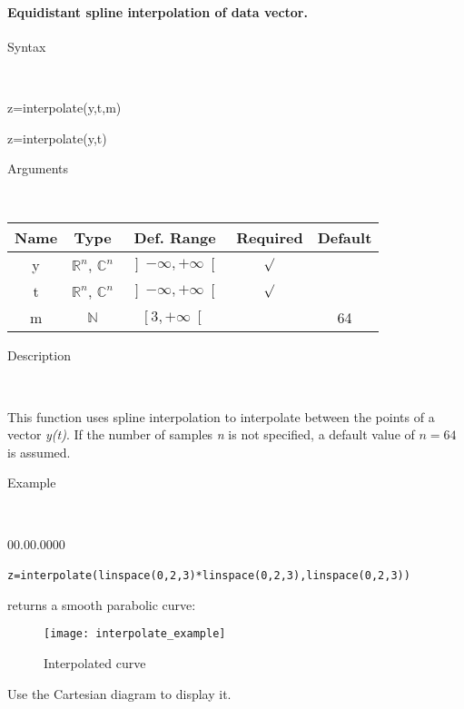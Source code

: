 \paragraph{\label{par:spline-interpolation}Equidistant spline interpolation
of data vector.}

\begin{description}
\item [Syntax]~
\end{description}
z=interpolate(y,t,m)

z=interpolate(y,t)

\begin{description}
\item [Arguments]~
\end{description}
\begin{tabular}{|c|c|c|c|c|}
\hline 
Name&
Type&
Def. Range&
Required&
Default\tabularnewline
\hline
\hline 
y&
$\mathbb{R}^{n}$, $\mathbb{C}^{n}$&
$\left]-\infty,+\infty\right[$&
$\surd$&
\tabularnewline
\hline
t&
$\mathbb{R}^{n}$, $\mathbb{C}^{n}$&
$\left]-\infty,+\infty\right[$&
$\surd$&
\tabularnewline
\hline
m&
$\mathbb{N}$&
$\left[3,+\infty\right[$&
&
64\tabularnewline
\hline
\end{tabular}

\begin{description}
\item [Description]~
\end{description}
This function uses spline interpolation to interpolate between the
points of a vector \textit{y(t)}. If the number of samples \textit{n}
is not specified, a default value of $n=64$ is assumed.

\begin{description}
\item [Example]~
\end{description}
\begin{lyxlist}{00.00.0000}
\item [\texttt{z=interpolate(linspace(0,2,3){*}linspace(0,2,3),linspace(0,2,3))}]~
\end{lyxlist}
returns a smooth parabolic curve:

%
\begin{figure}[ht]
\begin{center}\texttt{[image: interpolate\_example]}\end{center}


\caption{Interpolated curve}
\end{figure}


Use the Cartesian diagram to display it.

